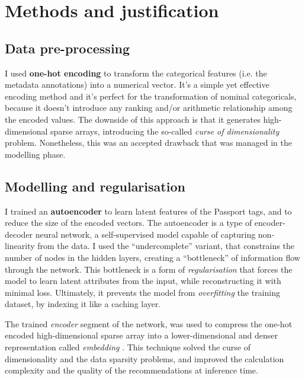 
\section{Methods and justification}

\subsection{Data pre-processing}

I used \textbf{one-hot encoding} to transform the categorical features (i.e. the metadata annotations) into a numerical vector.
It's a simple yet effective encoding method and it's perfect for the transformation of nominal categoricals,
because it doesn't introduce any ranking and/or arithmetic relationship among the
encoded values. The downside of this approach is that it generates high-dimensional sparse arrays,
introducing the so-called \textit{curse of dimensionality} problem. Nonetheless, this was an accepted drawback that was
managed in the modelling phase.

\subsection{Modelling and regularisation}

I trained an \textbf{autoencoder} \cite{DBLP:journals/corr/abs-2003-05991,DBLP:journals/corr/abs-2201-03898}
to learn latent features of the Passport tags, and to reduce the size of the encoded vectors.
The autoencoder is a type of encoder-decoder neural network, a self-supervised model capable of capturing non-linearity from the data.
I used the ``undercomplete'' variant, that constrains the number of nodes in the hidden layers, creating a ``bottleneck''
of information flow through the network.
This bottleneck is a form of \textit{regularisation} that forces the model to learn latent attributes from the input,
while reconstructing it with minimal loss. Ultimately, it prevents the model from \textit{overfitting} the training dataset,
by indexing it like a caching layer.

The trained \textit{encoder} segment of the network, was used to compress the one-hot encoded high-dimensional sparse array into
a lower-dimensional and denser representation called \textit{embedding} \cite{GoogleForDevelopers:Embeddings}.
This technique solved the curse of dimensionality and the data sparsity problems, and improved the calculation complexity and the quality
of the recommendations at inference time.

